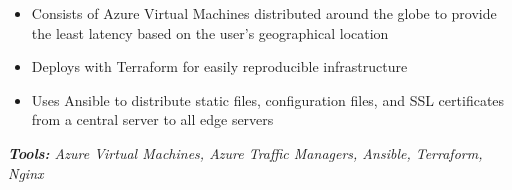 \documentclass[10pt,letter]{altacv}
\begin{document}

\smallskip
\divider
\smallskip

\begin{itemize}
\item Consists of Azure Virtual Machines distributed around the globe to provide the least latency based on the user's geographical location
\item Deploys with Terraform for easily reproducible infrastructure 
\item Uses Ansible to distribute static files, configuration files, and SSL certificates from a central server to all edge servers
\end{itemize}
\textit{\textbf{Tools:} Azure Virtual Machines, Azure Traffic Managers, Ansible, Terraform, Nginx}

\clearpage
\end{document}
